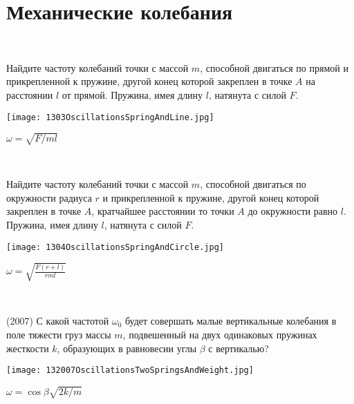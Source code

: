 \section{Механические колебания}


\begin{ex}
\hspace{0pt} \\
\begin{minipage}{.65\textwidth}
Найдите частоту колебаний точки с массой $m$, способной двигаться по прямой и прикрепленной к пружине, другой конец которой закреплен в точке $A$ на расстоянии $l$ от прямой. Пружина, имея длину $l$, натянута с силой $F$.
\end{minipage}
\begin{minipage}{.35\textwidth}
\centering
\texttt{[image: 1303OscillationsSpringAndLine.jpg]}
\end{minipage}
\begin{ans}
$\omega = \sqrt{F/ml}$
\end{ans}
\end{ex}

\begin{ex}
\hspace{0pt} \\
\begin{minipage}{.65\textwidth}
Найдите частоту колебаний точки с массой $m$, способной двигаться по окружности радиуса $r$ и прикрепленной к пружине, другой конец которой закреплен в точке $A$, кратчайшее расстоянии то точки $A$ до окружности равно $l$. Пружина, имея длину $l$, натянута с силой $F$.
\end{minipage}
\begin{minipage}{.35\textwidth}
\centering
\texttt{[image: 1304OscillationsSpringAndCircle.jpg]}
\end{minipage}
\begin{ans}
$\omega = \sqrt{\frac{F(r+l)}{rml}}$
\end{ans}
\end{ex}

\begin{ex}
\hspace{0pt} \\
\begin{minipage}{.65\textwidth} 
(2007) С какой частотой $\omega_0$ будет совершать малые вертикальные колебания в поле тяжести груз массы $m$, подвешенный на двух одинаковых пружинах жесткости $k$, образующих в равновесии углы $\beta$ с вертикалью?
\end{minipage}
\begin{minipage}{.35\textwidth}
\centering
\texttt{[image: 132007OscillationsTwoSpringsAndWeight.jpg]}
\end{minipage}
\begin{ans}
$\omega = \cos \beta \sqrt{2k/m}$
\end{ans}
\end{ex}

